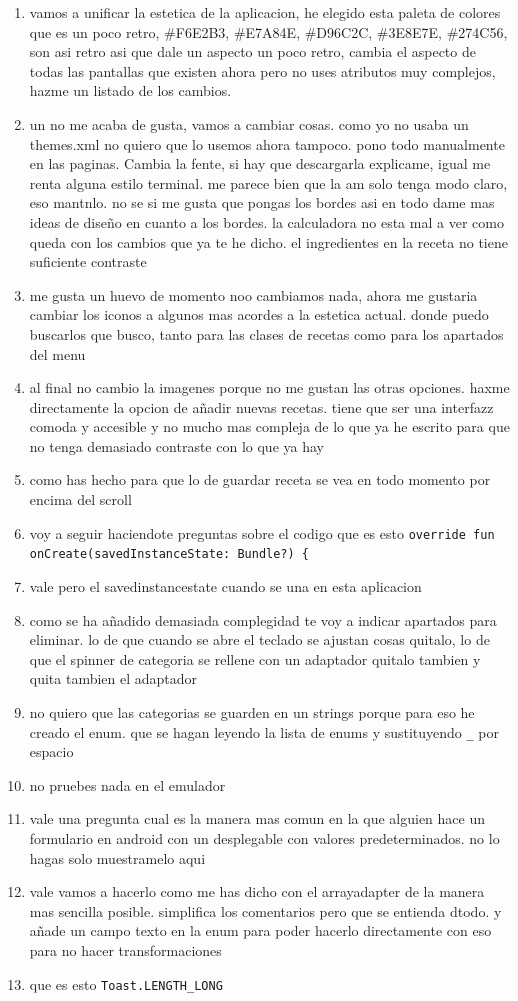 \begin{enumerate}
  \item vamos a unificar la estetica de la aplicacion, he elegido esta paleta de colores que es un poco retro, \#F6E2B3, \#E7A84E, \#D96C2C, \#3E8E7E, \#274C56, son asi retro asi que dale un aspecto un poco retro, cambia el aspecto de todas las pantallas que existen ahora pero no uses atributos muy complejos, hazme un listado de los cambios.
  \item un no me acaba de gusta, vamos a cambiar cosas. como yo no usaba un themes.xml no quiero que lo usemos ahora tampoco. pono todo manualmente en las paginas.
  Cambia la fente, si hay que descargarla explicame, igual me renta alguna estilo terminal. me parece bien que la am solo tenga modo claro, eso mantnlo. no se si me gusta que pongas los bordes asi en todo dame mas ideas de diseño en cuanto a los bordes. la calculadora no esta mal a ver como queda con los cambios que ya te he dicho. el \textquotedbl ingredientes en la receta no tiene suficiente contraste
  \item me gusta un huevo de momento noo cambiamos nada, ahora me gustaria cambiar los iconos a algunos mas acordes a la estetica actual. donde puedo buscarlos que busco, tanto para las clases de recetas como para los apartados del menu
  \item al final no cambio la imagenes porque no me gustan las otras opciones. haxme directamente la opcion de añadir nuevas recetas. tiene que ser una interfazz comoda y accesible y no mucho mas compleja de lo que ya he escrito para que no tenga demasiado contraste con lo que ya hay
  \item como has hecho para que lo de guardar receta se vea en todo momento por encima del scroll
  \item voy a seguir haciendote preguntas sobre el codigo que es esto \verb|override fun onCreate(savedInstanceState: Bundle?) {|
  \item vale pero el savedinstancestate cuando se una en esta aplicacion
  \item como se ha añadido demasiada complegidad te voy a indicar apartados para eliminar. lo de que cuando se abre el teclado se ajustan cosas quitalo, lo de que el spinner de categoria se rellene con un adaptador quitalo tambien y quita tambien el adaptador
  \item no quiero que las categorias se guarden en un strings porque para eso he creado el enum. que se hagan leyendo la lista de enums y sustituyendo \verb|_| por espacio
  \item no pruebes nada en el emulador
  \item vale una pregunta cual es la manera mas comun en la que alguien hace un formulario en android con un desplegable con valores predeterminados. no lo hagas solo muestramelo aqui
  \item vale vamos a hacerlo como me has dicho con el arrayadapter de la manera mas sencilla posible. simplifica los comentarios pero que se entienda dtodo. y añade un campo texto en la enum para poder hacerlo directamente con eso para no hacer transformaciones
  \item que es esto \verb|Toast.LENGTH_LONG|
\end{enumerate}

